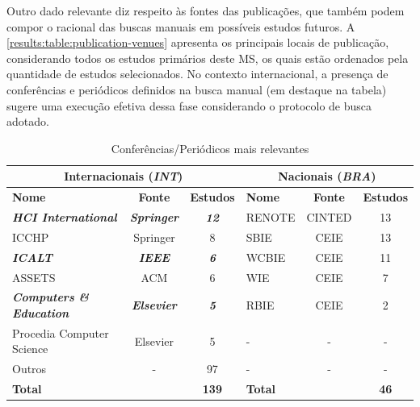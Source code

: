 
Outro dado relevante diz respeito às fontes das publicações, que também podem compor o racional das buscas manuais em possíveis estudos futuros. A \autoref{results:table:publication-venues} apresenta os principais locais de publicação, considerando todos os estudos primários deste MS, os quais estão ordenados pela quantidade de estudos selecionados. No contexto internacional, a presença de conferências e periódicos definidos na busca manual (em destaque na tabela) sugere uma execução efetiva dessa fase considerando o protocolo de busca adotado.

\begin{table}[htbp]
\caption{Conferências/Periódicos mais relevantes}
\label{results:table:publication-venues}
\centering
\begin{tabular}{lcc|lcc}
\hline
\multicolumn{3}{c|}{\textbf{Internacionais (\textit{INT})}} & \multicolumn{3}{c}{\textbf{Nacionais (\textit{BRA})}} \\ \hline
\textbf{Nome} & \textbf{Fonte} & \textbf{Estudos} & \textbf{Nome} & \textbf{Fonte} & \textbf{Estudos} \\ \hline
\textit{\textbf{HCI International}} & \textit{\textbf{Springer}} & \textit{\textbf{12}} & RENOTE & CINTED & 13 \\ 
ICCHP & Springer & 8 & SBIE & CEIE & 13 \\ 
\textit{\textbf{ICALT}} & \textit{\textbf{IEEE}} & \textit{\textbf{6}} & WCBIE & CEIE & 11 \\ 
ASSETS & ACM & 6 & WIE & CEIE & 7 \\ 
\textit{\textbf{Computers \& Education}} & \textit{\textbf{Elsevier}} & \textit{\textbf{5}} & RBIE & CEIE & 2 \\ 
Procedia Computer Science & Elsevier & 5 & - & - & - \\ 
Outros & - & 97 & - & - & - \\ 
\multicolumn{2}{l}{\textbf{Total}} & \textbf{139} & \multicolumn{2}{l}{\textbf{Total}} & \textbf{46} \\ \hline
\end{tabular}
\fautor
\end{table}

